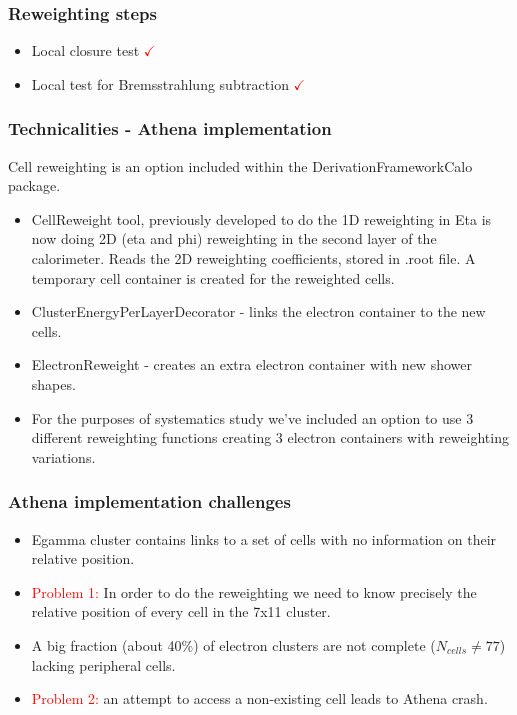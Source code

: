 \documentclass{beamer}
\begin{document}
\begin{frame}
\frametitle{Reweighting steps}
\begin{itemize}
\item Local closure test \textcolor{red}{ $\checkmark$}\\
\item Local test for Bremsstrahlung subtraction \textcolor{red}{ $\checkmark$}\\

\end{itemize}
\end{frame}
\begin{frame}
\frametitle{Technicalities - Athena implementation}
Cell reweighting is an option included within the DerivationFrameworkCalo package. 
\begin{itemize}
\item CellReweight tool, previously developed to do the 1D reweighting in Eta is now doing 2D (eta and phi) reweighting in the second layer of the calorimeter. Reads the 2D reweighting coefficients, stored in .root file. A temporary cell container is created for the reweighted cells.
\item ClusterEnergyPerLayerDecorator - links the electron container to the new cells.
\item ElectronReweight - creates an extra electron container with new shower shapes.
\item For the purposes of systematics study we've included an option to use 3 different reweighting functions creating 3 electron containers with reweighting variations.

\end{itemize}
\end{frame}

\begin{frame}
\frametitle{Athena implementation challenges}
\begin{itemize}
\item Egamma cluster contains links to a set of cells with no information on their relative position.
\item \textcolor{red}{Problem 1:} In order to do the reweighting we need to know precisely the relative position of every cell in the 7x11 cluster.
\item A big fraction (about 40\%) of electron clusters are not complete ($N_{cells} \ne 77$) lacking peripheral cells.
\item \textcolor{red}{Problem 2:} an attempt to access a non-existing cell leads to Athena crash.
\end{itemize}
\end{frame}
\end{document}
